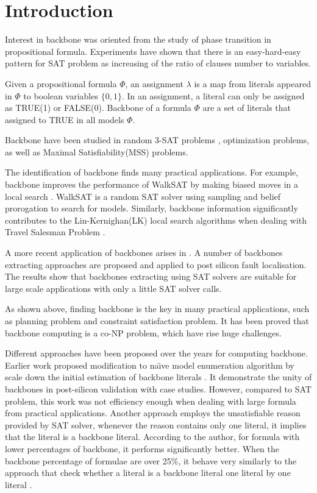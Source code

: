 
\section{Introduction}

Interest in backbone was oriented from the study of phase transition in propositional formula.
Experiments have shown that there is an easy-hard-easy pattern for SAT problem as increasing of the ratio of clauses number to variables.

Given a propositional formula $\Phi$, an assignment $\lambda$ is a map from literals appeared in $\Phi$ to boolean variables $\{0,1\}$. In an assignment, a literal can only be assigned as TRUE(1) or FALSE(0).
Backbone of a formula $\Phi$ are a set of literals that assigned to TRUE in all models $\Phi$\cite{BCJ2001,KPJ2005,MJML2010}.

Backbone have been studied in random 3-SAT problems \cite{DOG2001}, optimization problems\cite{CJG2001,KPS2005,WTS2001}, as well as Maximal Satisfiability(MSS) problems\cite{MM2005}.

The identification of backbone finds many practical applications. For example, backbone improves the performance of WalkSAT \cite{SBK1993} by making biased moves in a local search \cite{ZWR2003}. WalkSAT is a random SAT solver using sampling and belief prorogation \cite{MAR2007} to search for models. Similarly, backbone information significantly contributes to the Lin-Kernighan(LK) local search algorithms when dealing with Travel Salesman Problem \cite{ZWL2005}.

A more recent application of backbones arises in \cite{Z11}. A number of backbones extracting approaches are proposed and applied to post silicon fault localisation. The results show that backbones extracting using SAT solvers are suitable for large scale applications with only a little SAT solver calls.

As shown above, finding backbone is the key in many practical applications, such as planning problem and constraint satisfaction problem. It has been proved that backbone computing is a co-NP problem\cite{Jan10}, which have rise huge challenges.

Different approaches have been proposed over the years for computing backbone. Earlier work proposed modification to na\"{\i}ve model enumeration algorithm by scale down the initial estimation of backbone literals \cite{Z11}. It demonstrate the unity of backbones in post-silicon validation with case studies. However, compared to SAT problem, this work was not efficiency enough when dealing with large formula from practical applications. Another approach employs the unsatisfiable reason provided by SAT solver, whenever the reason contains only one literal, it implies that the literal is a backbone literal. According to the author, for formula with lower percentages of backbone, it performs significantly better. When the backbone percentage of formulae are over 25\%, it behave very similarly to the approach that check whether a literal is a backbone literal one literal by one literal \cite{MJML2010}.

